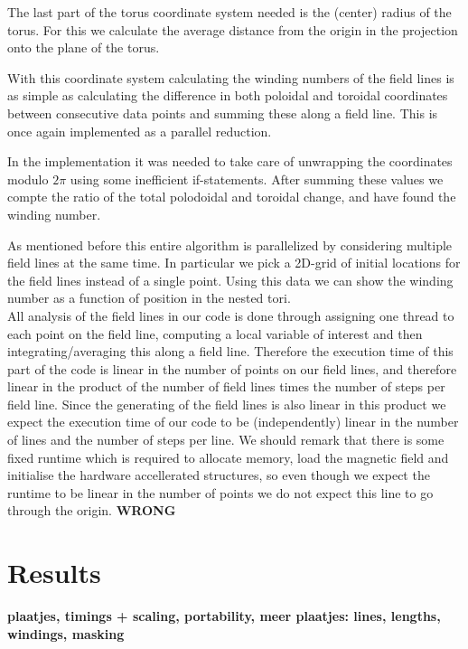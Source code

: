 \documentclass{article}
\begin{document}
The last part of the torus coordinate system needed is the (center) radius of the torus. For this we calculate the average distance from the origin in the projection onto the plane of the torus. %

With this coordinate system calculating the winding numbers of the field lines is as simple as calculating the difference in both poloidal and toroidal coordinates between consecutive data points and summing these along a field line. This is once again implemented as a parallel reduction.

In the implementation it was needed to take care of unwrapping the coordinates modulo $2\pi$ using some inefficient if-statements. %
After summing these values we compte the ratio of the total polodoidal and toroidal change, and have found the winding number.

As mentioned before this entire algorithm is parallelized by considering multiple field lines at the same time. In particular we pick a 2D-grid of initial locations for the field lines instead of a single point. Using this data we can show the winding number as a function of position in the nested tori.\\

All analysis of the field lines in our code is done through assigning one thread to each point on the field line, computing a local variable of interest and then integrating/averaging this along a field line. Therefore the execution time of this part of the code is linear in the number of points on our field lines, and therefore linear in the product of the number of field lines times the number of steps per field line. Since the generating of the field lines is also linear in this product we expect the execution time of our code to be (independently) linear in the number of lines and the number of steps per line. We should remark that there is some fixed runtime which is required to allocate memory, load the magnetic field and initialise the hardware accellerated structures, so even though we expect the runtime to be linear in the number of points we do not expect this line to go through the origin.
 \textbf{WRONG}

\section{Results}
{\bf plaatjes, timings + scaling, portability, meer plaatjes: lines, lengths, windings, masking}
\end{document}
